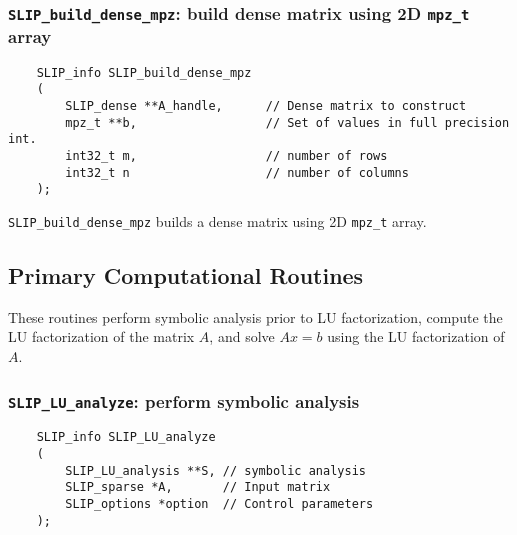 \documentclass[12pt]{article}
\theoremstyle{definition}
\begin{document}
\cprotect\subsubsection{\verb|SLIP_build_dense_mpz|: build dense matrix using 2D \verb|mpz_t| array}
\label{s:user:build_dense_mpz}

\begin{mdframed}[userdefinedwidth=6in]
{\footnotesize
\begin{verbatim}
    SLIP_info SLIP_build_dense_mpz
    (
        SLIP_dense **A_handle,      // Dense matrix to construct
        mpz_t **b,                  // Set of values in full precision int.
        int32_t m,                  // number of rows
        int32_t n                   // number of columns
    );
\end{verbatim}
} \end{mdframed}

\verb|SLIP_build_dense_mpz| builds a dense matrix using 2D \verb|mpz_t| array.

\subsection{Primary Computational Routines}

These routines perform symbolic analysis prior to LU factorization, compute the
LU factorization of the matrix $A$, and solve $Ax=b$ using the LU factorization
of $A$.

\cprotect\subsubsection{\verb|SLIP_LU_analyze|: perform symbolic analysis}
\label{s:SLIP_LU_analyze}

\begin{mdframed}[userdefinedwidth=6in]
{\footnotesize
\begin{verbatim}
    SLIP_info SLIP_LU_analyze
    (
        SLIP_LU_analysis **S, // symbolic analysis
        SLIP_sparse *A,       // Input matrix
        SLIP_options *option  // Control parameters
    );
\end{verbatim}
} \end{mdframed}
\end{document}
